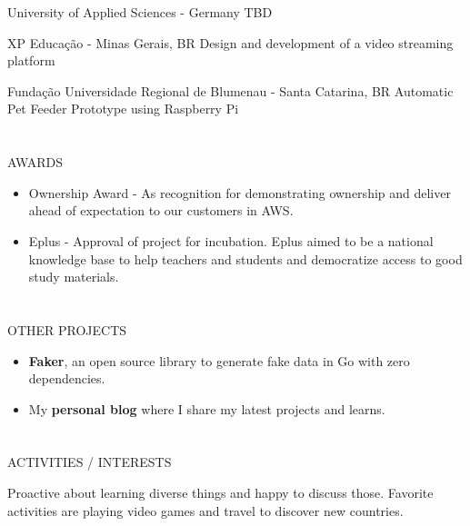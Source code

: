 \documentclass{my_cv}
\begin{document}
\begin{multicols}{2}
{University of Applied Sciences - Germany} %
{TBD}

{XP Educação - Minas Gerais, BR} %
{Design and development of a video streaming platform}

{Fundação Universidade Regional de Blumenau - Santa Catarina, BR} %
{Automatic Pet Feeder Prototype using Raspberry Pi}

\section{\faStar}{AWARDS}

\begin{itemize}[noitemsep]
    \item Ownership Award - As recognition for demonstrating ownership and deliver ahead of expectation to our customers in AWS.
    \item Eplus - Approval of project for incubation. Eplus aimed to be a national knowledge base to help teachers and students and democratize access to good study materials.
\end{itemize}

\section{\faPaintBrush}{OTHER PROJECTS}
\begin{itemize}[noitemsep]
    \item \textbf{Faker}, an open source library to generate fake data in Go with zero dependencies.
    \item My \textbf{personal blog} where I share my latest projects and learns.
\end{itemize}

\section{\faSoccerBallO}{ACTIVITIES / INTERESTS}

Proactive about learning diverse things and happy to discuss those. Favorite activities are playing video games and travel to discover new countries.


\end{multicols}
\end{document}
